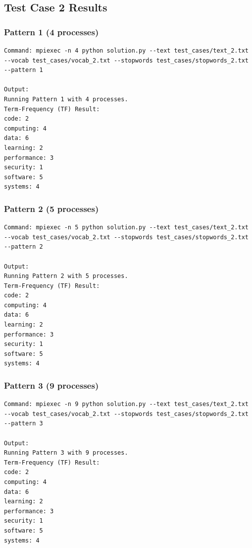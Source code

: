 \documentclass[12pt,a4paper]{article}
\begin{document}
\subsection{Test Case 2 Results}

\subsubsection{Pattern 1 (4 processes)}
\begin{lstlisting}
Command: mpiexec -n 4 python solution.py --text test_cases/text_2.txt --vocab test_cases/vocab_2.txt --stopwords test_cases/stopwords_2.txt --pattern 1

Output:
Running Pattern 1 with 4 processes.
Term-Frequency (TF) Result:
code: 2
computing: 4
data: 6
learning: 2
performance: 3
security: 1
software: 5
systems: 4
\end{lstlisting}

\subsubsection{Pattern 2 (5 processes)}
\begin{lstlisting}
Command: mpiexec -n 5 python solution.py --text test_cases/text_2.txt --vocab test_cases/vocab_2.txt --stopwords test_cases/stopwords_2.txt --pattern 2

Output:
Running Pattern 2 with 5 processes.
Term-Frequency (TF) Result:
code: 2
computing: 4
data: 6
learning: 2
performance: 3
security: 1
software: 5
systems: 4
\end{lstlisting}

\subsubsection{Pattern 3 (9 processes)}
\begin{lstlisting}
Command: mpiexec -n 9 python solution.py --text test_cases/text_2.txt --vocab test_cases/vocab_2.txt --stopwords test_cases/stopwords_2.txt --pattern 3

Output:
Running Pattern 3 with 9 processes.
Term-Frequency (TF) Result:
code: 2
computing: 4
data: 6
learning: 2
performance: 3
security: 1
software: 5
systems: 4
\end{lstlisting}
\end{document}
